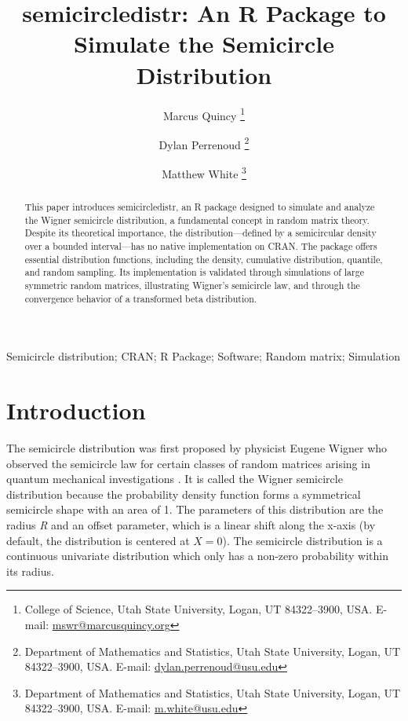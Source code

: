 \documentclass[11pt]{asaproc}
\title{semicircledistr: An R Package to Simulate the Semicircle Distribution}
\author{Marcus Quincy \thanks{College of Science, Utah State University, Logan, UT 84322--3900, USA.
    E-mail: \url{mswr@marcusquincy.org}}
  \and Dylan Perrenoud \thanks{Department of Mathematics and Statistics, Utah State University, Logan, UT 84322--3900, USA.
    E-mail: \url{dylan.perrenoud@usu.edu}}
  \and Matthew White \thanks{Department of Mathematics and Statistics, Utah State University, Logan, UT 84322--3900, USA.
    E-mail: \url{m.white@usu.edu}}
}
\begin{document}
\renewcommand{\topfraction}{1.0}
\renewcommand{\bottomfraction}{1.0}
\renewcommand{\textfraction}{0.0}
\renewcommand{\floatpagefraction}{1.0}
\renewcommand{\dbltopfraction}{1.0}


\maketitle

\begin{abstract}
This paper introduces semicircledistr, an R package designed to simulate and analyze the Wigner semicircle distribution, a fundamental concept in random matrix theory. Despite its theoretical importance, the distribution—defined by a semicircular density over a bounded interval—has no native implementation on CRAN. The package offers essential distribution functions, including the density, cumulative distribution, quantile, and random sampling. Its implementation is validated through simulations of large symmetric random matrices, illustrating Wigner’s semicircle law, and through the convergence behavior of a transformed beta distribution.
\end{abstract}

\begin{keywords}Semicircle distribution; CRAN; R Package; Software; Random matrix; Simulation
\end{keywords}


\section{Introduction}
\label{Introduction}

The semicircle distribution was first proposed by physicist Eugene Wigner who
observed the semicircle law for certain classes of random matrices arising in
quantum mechanical investigations \citep{wigner1955characteristic}. It is called the Wigner semicircle
distribution because the probability density function forms a symmetrical
semicircle shape with an area of 1. The parameters of this distribution are
the radius \textit{R} and an offset parameter, which is a linear shift along the
x-axis (by default, the distribution is centered at $X = 0$). The semicircle
distribution is a continuous univariate distribution which only has a non-zero
probability within its radius.

\end{document}
